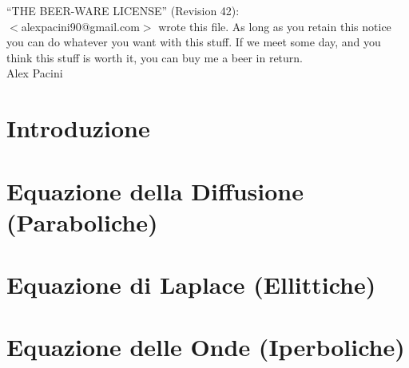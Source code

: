 \documentclass[a4paper]{report}
\begin{document}
%

%
\null
\vfill
%
	``THE BEER-WARE LICENSE'' (Revision 42): \\
	$<$alexpacini90@gmail.com$>$ wrote this file.
	As long as you retain this notice you
	can do whatever you want with this stuff.
	If we meet some day, and you think
	this stuff is worth it, you can buy me a beer in return.\\
	Alex Pacini
%
\newpage
\tableofcontents
\newpage
%
\chapter{Introduzione}	\label{chap:intro}

%
\chapter{Equazione della Diffusione (Paraboliche)}	\label{chap:diffusion}

%
\chapter{Equazione di Laplace (Ellittiche)}		\label{chap:laplacian}

%
\chapter{Equazione delle Onde (Iperboliche)}		\label{chap:waves}

%
\listoffigures
%
\end{document}
